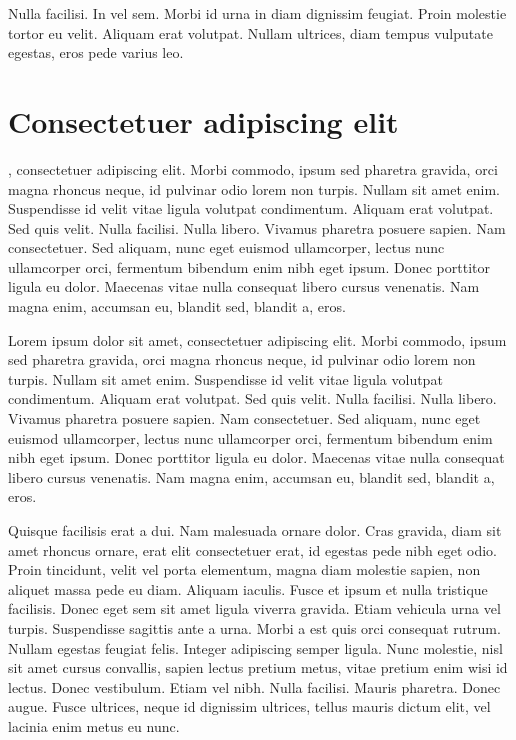 \begin{savequote}[75mm]
Nulla facilisi. In vel sem. Morbi id urna in diam dignissim feugiat. Proin molestie tortor eu velit. Aliquam erat volutpat. Nullam ultrices, diam tempus vulputate egestas, eros pede varius leo.
\end{savequote}

\chapter{Consectetuer adipiscing elit}

, consectetuer adipiscing elit. Morbi commodo, ipsum sed pharetra gravida, orci magna rhoncus neque, id pulvinar odio lorem non turpis. Nullam sit amet enim. Suspendisse id velit vitae ligula volutpat condimentum. Aliquam erat volutpat. Sed quis velit. Nulla facilisi. Nulla libero. Vivamus pharetra posuere sapien. Nam consectetuer. Sed aliquam, nunc eget euismod ullamcorper, lectus nunc ullamcorper orci, fermentum bibendum enim nibh eget ipsum. Donec porttitor ligula eu dolor. Maecenas vitae nulla consequat libero cursus venenatis. Nam magna enim, accumsan eu, blandit sed, blandit a, eros.

Lorem ipsum dolor sit amet, consectetuer adipiscing elit. Morbi commodo, ipsum sed pharetra gravida, orci magna rhoncus neque, id pulvinar odio lorem non turpis. Nullam sit amet enim. Suspendisse id velit vitae ligula volutpat condimentum. Aliquam erat volutpat. Sed quis velit. Nulla facilisi. Nulla libero. Vivamus pharetra posuere sapien. Nam consectetuer. Sed aliquam, nunc eget euismod ullamcorper, lectus nunc ullamcorper orci, fermentum bibendum enim nibh eget ipsum. Donec porttitor ligula eu dolor. Maecenas vitae nulla consequat libero cursus venenatis. Nam magna enim, accumsan eu, blandit sed, blandit a, eros.

Quisque facilisis erat a dui. Nam malesuada ornare dolor. Cras gravida, diam sit amet rhoncus ornare, erat elit consectetuer erat, id egestas pede nibh eget odio. Proin tincidunt, velit vel porta elementum, magna diam molestie sapien, non aliquet massa pede eu diam. Aliquam iaculis. Fusce et ipsum et nulla tristique facilisis. Donec eget sem sit amet ligula viverra gravida. Etiam vehicula urna vel turpis. Suspendisse sagittis ante a urna. Morbi a est quis orci consequat rutrum. Nullam egestas feugiat felis. Integer adipiscing semper ligula. Nunc molestie, nisl sit amet cursus convallis, sapien lectus pretium metus, vitae pretium enim wisi id lectus. Donec vestibulum. Etiam vel nibh. Nulla facilisi. Mauris pharetra. Donec augue. Fusce ultrices, neque id dignissim ultrices, tellus mauris dictum elit, vel lacinia enim metus eu nunc.

